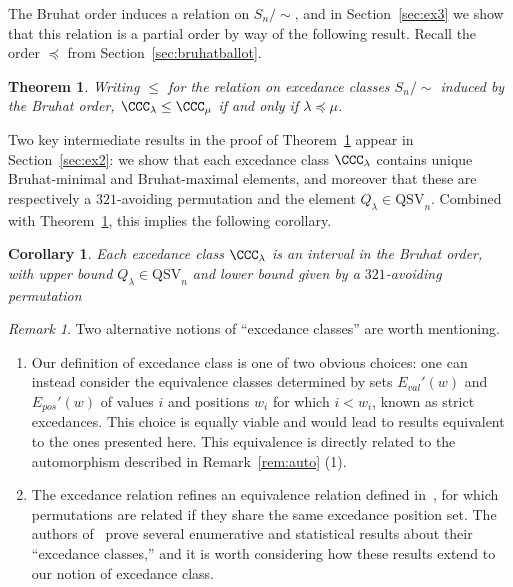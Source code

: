 \documentclass[12pt]{amsart}
\newcommand{\Nantel}[1]{\todo[size=\tiny,inline,color=blue!30]{#1 \\ \hfill --- Nantel}}
\newtheorem{thm}[equation]{Theorem}
\newtheorem{cor}[equation]{Corollary}
\theoremstyle{definition}
\theoremstyle{remark}
\newtheorem{rem}[equation]{Remark}
\numberwithin{equation}{section}
\newcommand{\QSV}{\mathrm{QSV}}
\newcommand{\EP}{E_{pos}}
\newcommand{\EV}{E_{val}}
\begin{document}
The Bruhat order induces a relation on $S_{n}\big/\!\!\sim$, and in Section~\ref{sec:ex3} we show that this relation is a partial order by way of the following result.  Recall the order $\preceq$ from Section~\ref{sec:bruhatballot}.

\begin{thm}
\label{thm:excedancequotient}
Writing $\le$ for the relation on excedance classes $S_{n}\big/\!\! \sim$ induced by the Bruhat order, $\CCC_{\lambda} \le \CCC_{\mu}$ if and only if $\lambda \preceq \mu$.
\end{thm}

Two key intermediate results in the proof of Theorem~\ref{thm:excedancequotient} appear in Section~\ref{sec:ex2}: we show that each excedance class $\CCC_{\lambda}$ contains unique Bruhat-minimal and Bruhat-maximal elements, and moreover that these are respectively a $321$-avoiding permutation and the element $Q_{\lambda} \in \QSV_{n}$.  Combined with Theorem~\ref{thm:excedancequotient}, this implies the following corollary.  

\begin{cor}\label{cor:interval}
Each excedance class $\CCC_{\lambda}$ is an interval in the Bruhat order, with upper bound $Q_{\lambda}\in \QSV_n$ and lower bound given by a $321$-avoiding permutation
\end{cor}



\begin{rem}
\label{rem:altECs}
Two alternative notions of ``excedance classes'' are worth mentioning.
\begin{enumerate}
\item Our definition of excedance class is one of two obvious choices: one can instead consider the equivalence classes determined by sets $\EV'(w)$ and $\EP'(w)$ of values $i$ and positions $w_{i}$ for which $i < w_{i}$, known as strict excedances.  
This choice is equally viable and would lead to results equivalent to the ones presented here.  This equivalence is directly  related to the automorphism described in Remark~\ref{rem:auto} (1).

\item The excedance relation refines an equivalence relation defined in~\cite{ES}, for which permutations are related if they share the same excedance position set.  
The authors of~\cite{ES} prove several enumerative and statistical results about their ``excedance classes,'' and it is worth considering how these results extend to our notion of excedance class.  
%

\end{enumerate}
\end{rem}
\end{document}
